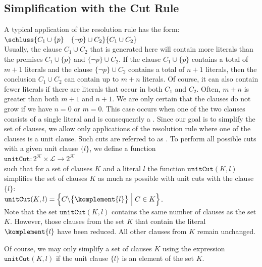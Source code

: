 \subsection{Simplification with the Cut Rule}
A typical application of the resolution rule has the form: \\[0.2cm]
\hspace*{1.3cm} $\schluss{ C_1 \cup \{p\} \quad \{\neg p\} \cup C_2}{C_1 \cup C_2}$
\\[0.2cm]
Usually, the clause $C_1 \cup C_2$ that is  generated here will contain more literals
than the premises $C_1 \cup \{p\}$ and $\{\neg p\} \cup C_2$. If the
clause $C_1 \cup \{p\}$ contains a total of $m+1$ literals and the clause
$\{\neg p\} \cup C_2$ contains a total of $n+1$ literals, then the conclusion $C_1 \cup C_2$
can contain up to $m + n$ literals. Of course, it can also contain fewer literals
if there are literals that occur in both $C_1$ and $C_2$.
Often, $m + n$ is greater than both $m + 1$ and $n + 1$.  We are only certain that the clauses
do not grow if we have $n = 0$ or $m = 0$.
This case occurs when one of the two clauses consists  of a single literal
and is consequently a .  Since our goal is to simplify the set of clauses,
we allow only applications of the resolution rule where
one of the clauses is a unit clause. Such cuts are referred to as
. To perform all possible cuts with a given unit clause $\{l\}$,
we define a function
\\[0.2cm]
\hspace*{1.3cm}
$\texttt{unitCut}: 2^\mathcal{K} \times \mathcal{L} \rightarrow 2^\mathcal{K}$
\\[0.2cm]
such that for a set of clauses $K$ and a literal $l$ the function
$\texttt{unitCut}(K,l)$ simplifies the set of clauses $K$ as much as possible with unit cuts with the clause
$\{l\}$:
\\[0.2cm]
\hspace*{1.3cm}
$\texttt{unitCut}(K,l) = \Bigl\{ C \backslash \bigl\{ \komplement{l} \bigr\} \;\Big|\; C \in K \Bigr\}$.
\\[0.2cm]
Note that the set $\texttt{unitCut}(K,l)$ contains the same number of clauses as the set
$K$. However, those clauses from the set $K$ that contain the literal $\komplement{l}$
have been reduced. All other clauses from $K$ remain unchanged.

Of course, we may only simplify a set of clauses $K$ using the expression $\texttt{unitCut}(K, l)$ if
the unit clause $\{l\}$ is an element of the set $K$.


